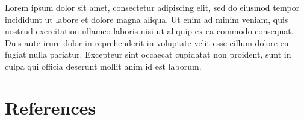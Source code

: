 \documentclass[
  11pt,
  canadian,
  a4paper,
  open=right,
  twoside=true,
  cleardoublepage=empty,
  clearpage=empty]{scrbook}
\newenvironment{cslreferences}%
  {}%
  {\par}
\begin{document}
Lorem ipsum dolor sit amet, consectetur adipiscing elit, sed do eiusmod tempor incididunt ut labore et dolore magna aliqua. Ut enim ad minim veniam, quis nostrud exercitation ullamco laboris nisi ut aliquip ex ea commodo consequat. Duis aute irure dolor in reprehenderit in voluptate velit esse cillum dolore eu fugiat nulla pariatur. Excepteur sint occaecat cupidatat non proident, sunt in culpa qui officia deserunt mollit anim id est laborum.

\hypertarget{references-1}{%
\chapter*{References}\label{references-1}}


\hypertarget{refs}{}
\begin{cslreferences}
\end{cslreferences}

\appendix

\backmatter
\end{document}
